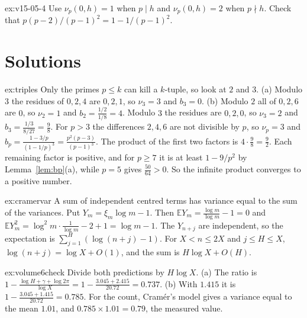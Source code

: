 \begin{hint}{ex:v15-05-4}
Use \(\nu_p(0,h)=1\) when \(p\mid h\) and \(\nu_p(0,h)=2\) when \(p\nmid h\). Check that \(p(p-2)/(p-1)^2=1-1/(p-1)^2\).
\end{hint}

\section{Solutions}

\begin{solution}{ex:triples}
\idea Only the primes $p\le k$ can kill a $k$-tuple, so look at $2$ and $3$.
\writeup (a) Modulo $3$ the residues of $0,2,4$ are $0,2,1$, so $\nu_3=3$ and $b_3=0$. (b) Modulo $2$ all of $0,2,6$ are $0$, so $\nu_2=1$ and $b_2=\frac{1/2}{1/8}=4$. Modulo $3$ the residues are $0,2,0$, so $\nu_3=2$ and $b_3=\frac{1/3}{8/27}=\frac98$. For $p>3$ the differences $2,4,6$ are not divisible by $p$, so $\nu_p=3$ and $b_p=\frac{1-3/p}{(1-1/p)^3}=\frac{p^2(p-3)}{(p-1)^3}$. The product of the first two factors is $4\cdot\frac98=\frac92$. Each remaining factor is positive, and for $p\ge7$ it is at least $1-9/p^2$ by Lemma~\ref{lem:bp}(a), while $p=5$ gives $\frac{50}{64}>0$. So the infinite product converges to a positive number.
\end{solution}

\begin{solution}{ex:cramervar}
\idea A sum of independent centred terms has variance equal to the sum of the variances.
\writeup Put $Y_m=\xi_m\log m-1$. Then $\mathbb EY_m=\frac{\log m}{\log m}-1=0$ and $\mathbb EY_m^2=\log^2m\cdot\frac1{\log m}-2+1=\log m-1$. The $Y_{n+j}$ are independent, so the expectation is $\sum_{j=1}^H(\log(n+j)-1)$. For $X<n\le2X$ and $j\le H\le X$, $\log(n+j)=\log X+O(1)$, and the sum is $H\log X+O(H)$.
\end{solution}

\begin{solution}{ex:volume6check}
\idea Divide both predictions by $H\log X$.
\writeup (a) The ratio is $1-\frac{\log H+\gamma+\log2\pi}{\log X}=1-\frac{3.045+2.415}{20.72}=0.737$. (b) With $1.415$ it is $1-\frac{3.045+1.415}{20.72}=0.785$. For the count, Cram\'er's model gives a variance equal to the mean $1.01$, and $0.785\times1.01=0.79$, the measured value.
\end{solution}

